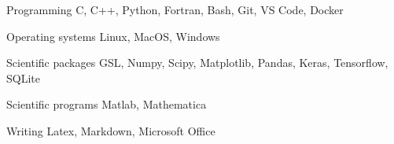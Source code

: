 

\begin{cvskills}

    \cvskill
        {Programming} %
        {C, C++, Python, Fortran, Bash, Git, VS Code, Docker} %

    \cvskill
        {Operating systems} %
        {Linux, MacOS, Windows} %

    \cvskill
        {Scientific packages} %
        {GSL, Numpy, Scipy, Matplotlib, Pandas, Keras, Tensorflow, SQLite} %

    \cvskill
        {Scientific programs} %
        {Matlab, Mathematica} %


    \cvskill
        {Writing} %
        {Latex, Markdown, Microsoft Office} %

\end{cvskills}